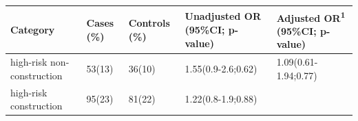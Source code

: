 \begin{longtable}[]{@{}lllll@{}}
\toprule
\begin{minipage}[b]{0.20\columnwidth}\raggedright
Category\strut
\end{minipage} & \begin{minipage}[b]{0.08\columnwidth}\raggedright
Cases (\%)\strut
\end{minipage} & \begin{minipage}[b]{0.10\columnwidth}\raggedright
Controls (\%)\strut
\end{minipage} & \begin{minipage}[b]{0.24\columnwidth}\raggedright
Unadjusted OR (95\%CI; p-value)\strut
\end{minipage} & \begin{minipage}[b]{0.23\columnwidth}\raggedright
Adjusted OR\textsuperscript{1} (95\%CI; p-value)\strut
\end{minipage}\tabularnewline
\midrule
\endhead
\begin{minipage}[t]{0.20\columnwidth}\raggedright
high-risk non-construction\strut
\end{minipage} & \begin{minipage}[t]{0.08\columnwidth}\raggedright
53(13)\strut
\end{minipage} & \begin{minipage}[t]{0.10\columnwidth}\raggedright
36(10)\strut
\end{minipage} & \begin{minipage}[t]{0.24\columnwidth}\raggedright
1.55(0.9-2.6;0.62)\strut
\end{minipage} & \begin{minipage}[t]{0.23\columnwidth}\raggedright
1.09(0.61-1.94;0.77)\strut
\end{minipage}\tabularnewline
\begin{minipage}[t]{0.20\columnwidth}\raggedright
high-risk construction\strut
\end{minipage} & \begin{minipage}[t]{0.08\columnwidth}\raggedright
95(23)\strut
\end{minipage} & \begin{minipage}[t]{0.10\columnwidth}\raggedright
81(22)\strut
\end{minipage} & \begin{minipage}[t]{0.24\columnwidth}\raggedright
1.22(0.8-1.9;0.88)\strut
\end{minipage} & \begin{minipage}[t]{0.23\columnwidth}\raggedright

\end{minipage}
\end{longtable}
